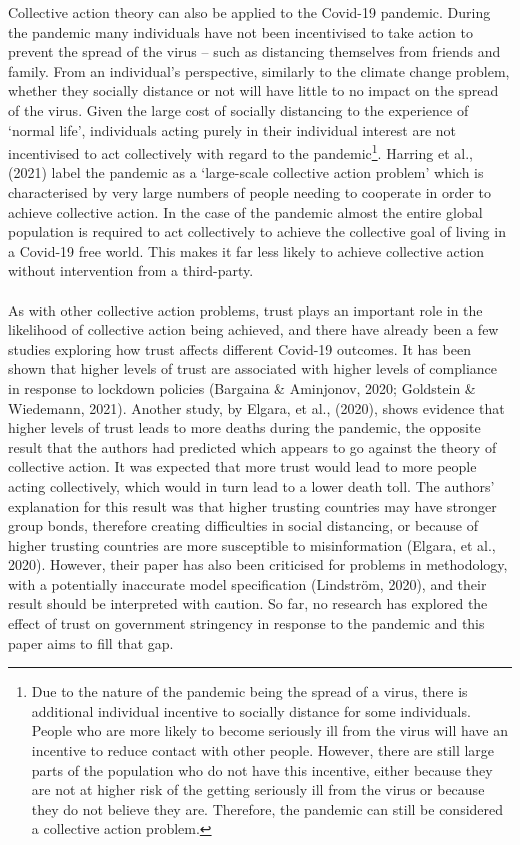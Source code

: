 \documentclass[
  12pt,
]{article}
\begin{document}
Collective action theory can also be applied to the Covid-19 pandemic. During the pandemic many individuals have not been incentivised to take action to prevent the spread of the virus -- such as distancing themselves from friends and family. From an individual's perspective, similarly to the climate change problem, whether they socially distance or not will have little to no impact on the spread of the virus. Given the large cost of socially distancing to the experience of `normal life', individuals acting purely in their individual interest are not incentivised to act collectively with regard to the pandemic\footnote{Due to the nature of the pandemic being the spread of a virus, there is additional individual incentive to socially distance for some individuals. People who are more likely to become seriously ill from the virus will have an incentive to reduce contact with other people. However, there are still large parts of the population who do not have this incentive, either because they are not at higher risk of the getting seriously ill from the virus or because they do not believe they are. Therefore, the pandemic can still be considered a collective action problem.}. Harring et al., (2021) label the pandemic as a `large-scale collective action problem' which is characterised by very large numbers of people needing to cooperate in order to achieve collective action. In the case of the pandemic almost the entire global population is required to act collectively to achieve the collective goal of living in a Covid-19 free world. This makes it far less likely to achieve collective action without intervention from a third-party.\\
~\\
As with other collective action problems, trust plays an important role in the likelihood of collective action being achieved, and there have already been a few studies exploring how trust affects different Covid-19 outcomes. It has been shown that higher levels of trust are associated with higher levels of compliance in response to lockdown policies (Bargaina \& Aminjonov, 2020; Goldstein \& Wiedemann, 2021). Another study, by Elgara, et al., (2020), shows evidence that higher levels of trust leads to more deaths during the pandemic, the opposite result that the authors had predicted which appears to go against the theory of collective action. It was expected that more trust would lead to more people acting collectively, which would in turn lead to a lower death toll. The authors' explanation for this result was that higher trusting countries may have stronger group bonds, therefore creating difficulties in social distancing, or because of higher trusting countries are more susceptible to misinformation (Elgara, et al., 2020). However, their paper has also been criticised for problems in methodology, with a potentially inaccurate model specification (Lindström, 2020), and their result should be interpreted with caution. So far, no research has explored the effect of trust on government stringency in response to the pandemic and this paper aims to fill that gap.\\
\end{document}
